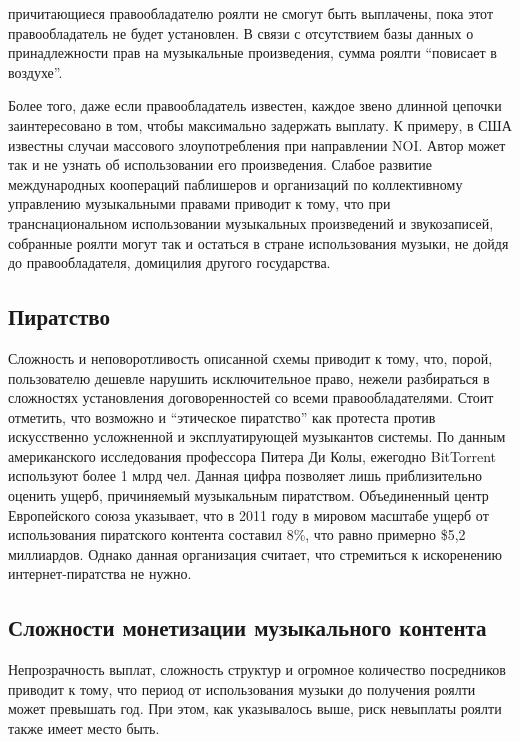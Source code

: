 \documentclass[12pt]{report}
\begin{document}
\begin{multicols}{2}
причитающиеся правообладателю роялти не смогут быть выплачены, пока этот правообладатель не будет установлен. В связи с отсутствием базы данных о принадлежности прав на музыкальные произведения, сумма роялти “повисает в воздухе”.

Более того,  даже если правообладатель известен, каждое звено длинной цепочки заинтересовано в том, чтобы максимально задержать выплату. К примеру, в США известны случаи массового злоупотребления при направлении NOI. Автор может так и не узнать об использовании его произведения. Слабое развитие международных коопераций паблишеров и организаций по коллективному управлению музыкальными правами приводит к тому, что при транснациональном использовании музыкальных произведений и звукозаписей, собранные роялти могут так и остаться в стране использования музыки, не дойдя до правообладателя, домицилия другого государства. 

\subsection{Пиратство}

Сложность и неповоротливость описанной схемы приводит к тому, что, порой, пользователю дешевле нарушить исключительное право, нежели разбираться в сложностях установления договоренностей со всеми правообладателями.
Стоит отметить, что возможно и “этическое пиратство” как протеста против искусственно усложненной и эксплуатирующей музыкантов системы.
По данным американского исследования профессора Питера Ди Колы, ежегодно BitTorrent используют более 1 млрд чел. Данная цифра позволяет лишь приблизительно оценить ущерб, причиняемый музыкальным пиратством. Объединенный центр Европейского союза указывает, что в 2011 году в мировом масштабе ущерб от использования пиратского контента составил 8\%, что равно примерно \$5,2 миллиардов. Однако данная организация считает, что стремиться к искоренению интернет-пиратства не нужно.

\subsection{Сложности монетизации музыкального контента}

Непрозрачность выплат, сложность структур и огромное количество посредников приводит к тому, что период от использования музыки до получения роялти может превышать год. При этом, как указывалось выше, риск невыплаты роялти также имеет место быть.

\end{multicols}
\end{document}
